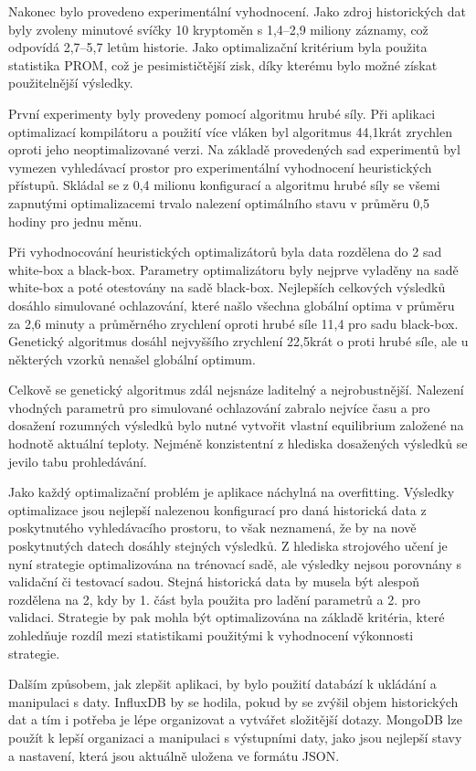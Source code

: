 Nakonec bylo provedeno experimentální vyhodnocení.
Jako zdroj historických dat byly zvoleny minutové svíčky 10 kryptoměn s 1,4--2,9 miliony záznamy, což odpovídá 2,7--5,7 letům historie.
Jako optimalizační kritérium byla použita statistika PROM, což je pesimističtější zisk, díky kterému bylo možné získat použitelnější výsledky.

První experimenty byly provedeny pomocí algoritmu hrubé síly.
Při aplikaci optimalizací kompilátoru a použití více vláken byl algoritmus 44,1krát zrychlen oproti jeho neoptimalizované verzi.
Na základě provedených sad experimentů byl vymezen vyhledávací prostor pro experimentální vyhodnocení heuristických přístupů.
Skládal se z 0,4 milionu konfigurací a algoritmu hrubé síly se všemi zapnutými optimalizacemi trvalo nalezení optimálního stavu v průměru 0,5 hodiny pro jednu měnu.

Při vyhodnocování heuristických optimalizátorů byla data rozdělena do 2 sad white-box a black-box.
Parametry optimalizátoru byly nejprve vyladěny na sadě white-box a poté otestovány na sadě black-box.
Nejlepších celkových výsledků dosáhlo simulované ochlazování, které našlo všechna globální optima v průměru za 2,6 minuty a průměrného zrychlení oproti hrubé síle 11,4 pro sadu black-box.
Genetický algoritmus dosáhl nejvyššího zrychlení 22,5krát o proti hrubé síle, ale u některých vzorků nenašel globální optimum.

Celkově se genetický algoritmus zdál nejsnáze laditelný a nejrobustnější.
Nalezení vhodných parametrů pro simulované ochlazování zabralo nejvíce času a pro dosažení rozumných výsledků bylo nutné vytvořit vlastní equilibrium založené na hodnotě aktuální teploty.
Nejméně konzistentní z hlediska dosažených výsledků se jevilo tabu prohledávání.

Jako každý optimalizační problém je aplikace náchylná na overfitting.
Výsledky optimalizace jsou nejlepší nalezenou konfigurací pro daná historická data z poskytnutého vyhledávacího prostoru, to však neznamená, že by na nově poskytnutých datech dosáhly stejných výsledků.
Z hlediska strojového učení je nyní strategie optimalizována na trénovací sadě, ale výsledky nejsou porovnány s validační či testovací sadou.
Stejná historická data by musela být alespoň rozdělena na 2, kdy by 1. část byla použita pro ladění parametrů a 2. pro validaci.
Strategie by pak mohla být optimalizována na základě kritéria, které zohledňuje rozdíl mezi statistikami použitými k vyhodnocení výkonnosti strategie.

Dalším způsobem, jak zlepšit aplikaci, by bylo použití databází k ukládání a manipulaci s daty.
InfluxDB by se hodila, pokud by se zvýšil objem historických dat a tím i potřeba je lépe organizovat a vytvářet složitější dotazy.
MongoDB lze použít k lepší organizaci a manipulaci s výstupními daty, jako jsou nejlepší stavy a nastavení, která jsou aktuálně uložena ve formátu JSON.